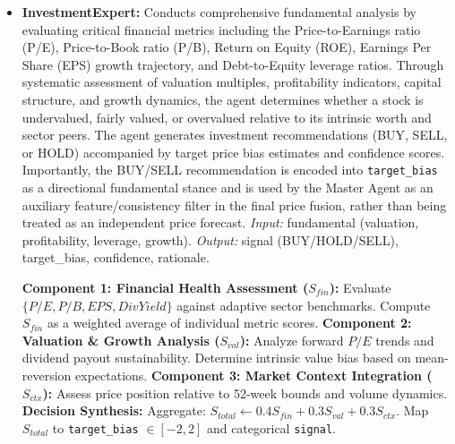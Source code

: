 \documentclass{ieeeaccess}
\begin{document}
\begin{itemize}
    \item \textbf{InvestmentExpert:} 
    Conducts comprehensive fundamental analysis by evaluating critical financial metrics including the Price-to-Earnings ratio (P/E), Price-to-Book ratio (P/B), Return on Equity (ROE), Earnings Per Share (EPS) growth trajectory, and Debt-to-Equity leverage ratios. Through systematic assessment of valuation multiples, profitability indicators, capital structure, and growth dynamics, the agent determines whether a stock is undervalued, fairly valued, or overvalued relative to its intrinsic worth and sector peers. The agent generates investment recommendations (BUY, SELL, or HOLD) accompanied by target price bias estimates and confidence scores. Importantly, the BUY/SELL recommendation is encoded into \texttt{target\_bias} as a directional fundamental stance and is used by the Master Agent as an auxiliary feature/consistency filter in the final price fusion, rather than being treated as an independent price forecast.  
    \textit{Input:} fundamental (valuation, profitability, leverage, growth).  
    \textit{Output:} signal (BUY/HOLD/SELL), target\_bias, confidence, rationale.

    \begin{algorithm}[H]
    \caption{InvestmentExpert fundamental scoring}
    \begin{algorithmic}[1]
    \STATE \textbf{Component 1: Financial Health Assessment ($S_{fin}$):}
    \STATE \quad Evaluate $\{P/E, P/B, EPS, DivYield\}$ against adaptive sector benchmarks.
    \STATE \quad Compute $S_{fin}$ as a weighted average of individual metric scores.
    \STATE \textbf{Component 2: Valuation \& Growth Analysis ($S_{val}$):}
    \STATE \quad Analyze forward $P/E$ trends and dividend payout sustainability.
    \STATE \quad Determine intrinsic value bias based on mean-reversion expectations.
    \STATE \textbf{Component 3: Market Context Integration ($S_{ctx}$):}
    \STATE \quad Assess price position relative to 52-week bounds and volume dynamics.
    \STATE \textbf{Decision Synthesis:}
    \STATE \quad Aggregate: $S_{total} \gets 0.4 S_{fin} + 0.3 S_{val} + 0.3 S_{ctx}$.
    \STATE \quad Map $S_{total}$ to \texttt{target\_bias} $\in [-2, 2]$ and categorical \texttt{signal}.
    \end{algorithmic}
    \end{algorithm}


\end{itemize}
\end{document}
